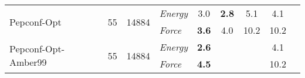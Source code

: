 \documentclass[varwidth]{standalone}
\begin{document}
\begin{adjustbox}{width=\textwidth,center}
\begin{tabular}{l c c l c c c c c}
\hline
\multirow{2}{*}{Pepconf-Opt} & \multirow{2}{*}{55} & \multirow{2}{*}{14884} & \textit{Energy} & 3.0 & \textbf{2.8} & 5.1 & 4.1\\
                                   &                       &                         & \textit{Force}  & \textbf{3.6} & 4.0 & 10.2 & 10.2\\
\hline
\multirow{2}{*}{Pepconf-Opt-Amber99} & \multirow{2}{*}{55} & \multirow{2}{*}{14884} & \textit{Energy} & \textbf{2.6} &  &  & 4.1\\
                                   &                       &                         & \textit{Force}  & \textbf{4.5} &  &  & 10.2\\
\hline
\hline
\hline
\end{tabular}

\end{adjustbox}
\end{document}
